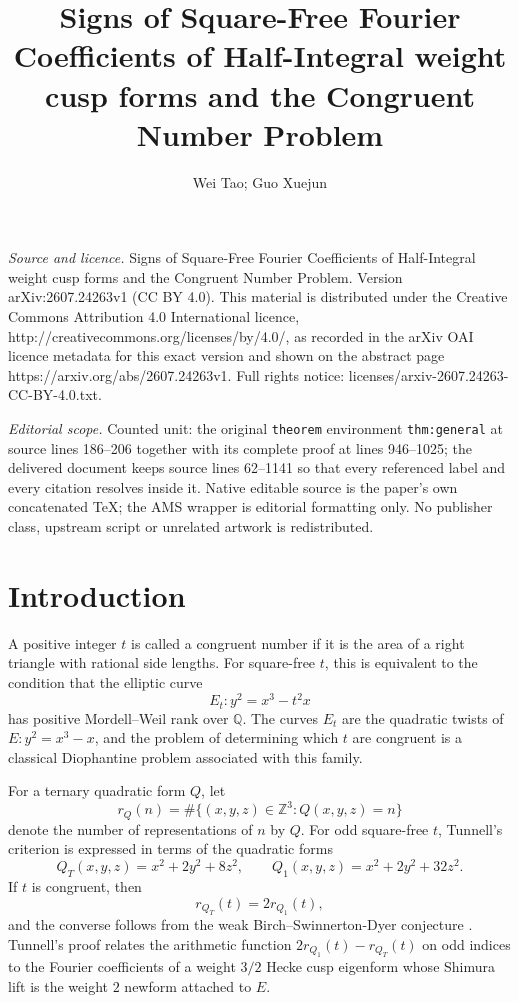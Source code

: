 \documentclass[10pt,a4paper]{amsart}
\newcommand{\Q}{\mathbb Q}
\newcommand{\Z}{\mathbb Z}
\begin{document}
\title[Signs of Square-Free Fourier Coefficients of Half-Integral w]{Signs of Square-Free Fourier Coefficients of Half-Integral weight cusp forms and the Congruent Number Problem}
\author{Wei Tao; Guo Xuejun}
\date{}
\maketitle
\noindent\emph{Source and licence.} Signs of Square-Free Fourier Coefficients of Half-Integral weight cusp forms and the Congruent Number Problem. Version arXiv:2607.24263v1 (CC BY 4.0). This material is distributed under the Creative Commons Attribution 4.0 International licence, http://creativecommons.org/licenses/by/4.0/, as recorded in the arXiv OAI licence metadata for this exact version and shown on the abstract page https://arxiv.org/abs/2607.24263v1. Full rights notice: licenses/arxiv-2607.24263-CC-BY-4.0.txt.\par\smallskip
\noindent\textit{Editorial scope.} Counted unit: the original \texttt{theorem} environment \texttt{thm:general} at source lines 186--206 together with its complete proof at lines 946--1025; the delivered document keeps source lines 62--1141 so that every referenced label and every citation resolves inside it. Native editable source is the paper's own concatenated TeX; the AMS wrapper is editorial formatting only. No publisher class, upstream script or unrelated artwork is redistributed.
\section{Introduction}
A positive integer $t$ is called a congruent number if it is the
area of a right triangle with rational side lengths. For square-free $t$,
this is equivalent to the condition that the elliptic curve
\[
E_t:y^2=x^3-t^2x
\]
has positive Mordell--Weil rank over $\Q$. The curves $E_t$ are the
quadratic twists of $E:y^2=x^3-x$, and the problem of determining which
$t$ are congruent is a classical Diophantine problem associated with this
family.

For a ternary quadratic form \(Q\), let
\[
r_Q(n)=\#\{(x,y,z)\in\Z^3:Q(x,y,z)=n\}
\]
denote the number of representations of \(n\) by \(Q\). For odd square-free
\(t\), Tunnell's criterion is expressed in terms of the quadratic forms
\[
Q_T(x,y,z)=x^2+2y^2+8z^2,
\qquad
Q_1(x,y,z)=x^2+2y^2+32z^2.
\]
If $t$ is congruent, then
\begin{equation}\label{eq:tunnell-odd}
r_{Q_T}(t)=2r_{Q_1}(t),
\end{equation}
and the converse follows from the weak Birch--Swinnerton-Dyer conjecture
\cite{Tunnell}. Tunnell's proof relates the arithmetic function
$2r_{Q_1}(t)-r_{Q_T}(t)$ on odd indices to the Fourier coefficients of a
weight $3/2$ Hecke cusp eigenform whose Shimura lift is the weight $2$
newform attached to $E$. 
\end{document}
